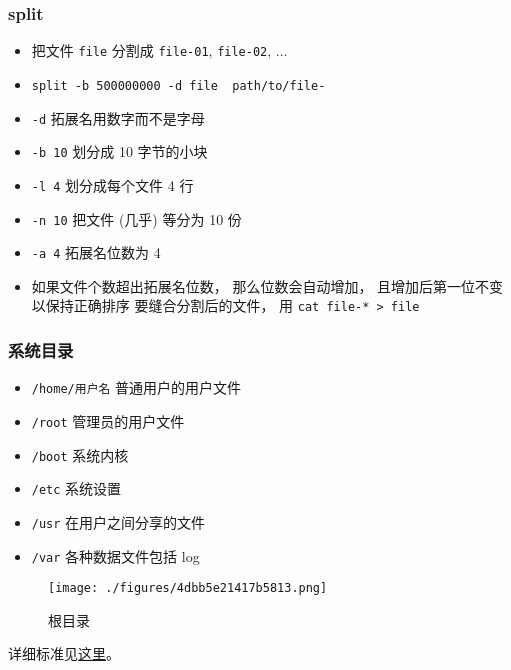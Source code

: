 \subsubsection{split}
\begin{itemize}
\item 把文件 \verb`file` 分割成 \verb`file-01`, \verb`file-02`, ...
\item \verb`split -b 500000000 -d file  path/to/file-`
\item \verb`-d` 拓展名用数字而不是字母
\item \verb`-b 10` 划分成 10 字节的小块
\item \verb`-l 4` 划分成每个文件 4 行
\item \verb`-n 10` 把文件 (几乎) 等分为 10 份
\item \verb`-a 4` 拓展名位数为 4
\item 如果文件个数超出拓展名位数， 那么位数会自动增加， 且增加后第一位不变以保持正确排序
要缝合分割后的文件， 用 \verb`cat file-* > file`
\end{itemize}

\subsubsection{系统目录}
\begin{itemize}
\item \verb|/home/用户名| 普通用户的用户文件
\item \verb|/root| 管理员的用户文件
\item \verb|/boot| 系统内核
\item \verb|/etc| 系统设置
\item \verb|/usr| 在用户之间分享的文件
\item \verb|/var| 各种数据文件包括 log
\end{itemize}
\begin{figure}[ht]
\centering
\texttt{[image: ./figures/4dbb5e21417b5813.png]}
\caption{根目录} \label{fig_LinNt_2}
\end{figure}
详细标准见\href{https://www.pathname.com/fhs/}{这里}。

